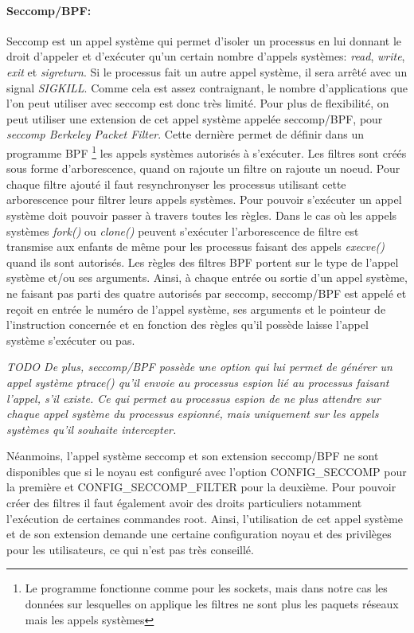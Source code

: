 \paragraph{Seccomp/BPF:}
Seccomp \cite{INTERCEPTION:seccomp_bpf} est un appel système qui permet d'isoler
un processus en lui donnant le droit d'appeler et d'exécuter qu'un certain
nombre d'appels systèmes: \textit{read}, \textit{write}, \textit{exit} et
\textit{sigreturn}. Si le processus fait un autre appel système, il sera arrêté avec un signal \textit{SIGKILL}. Comme cela est assez
contraignant, le nombre d'applications que l'on peut utiliser avec seccomp est
donc très limité. Pour plus de flexibilité, on peut utiliser une extension de
cet appel système appelée seccomp/BPF, pour \textit{seccomp Berkeley Packet
  Filter}. Cette dernière permet de définir dans un programme BPF \footnote{Le
  programme fonctionne comme pour les sockets, mais dans notre cas les données
  sur lesquelles on applique les filtres ne sont plus les paquets réseaux mais
  les appels systèmes} \cite{INTERCEPTION:bpf} les appels systèmes autorisés à
s'exécuter. Les filtres sont créés sous forme d'arborescence, quand on rajoute
un filtre on rajoute un noeud. Pour chaque filtre ajouté il faut resynchronyser
les processus utilisant cette arborescence pour filtrer leurs appels
systèmes. Pour pouvoir s'exécuter un appel système doit pouvoir passer à travers
toutes les règles. Dans le cas où les appels systèmes \textit{fork()} ou
\textit{clone()} peuvent s'exécuter l'arborescence de filtre est transmise aux
enfants de même pour les processus faisant des appels \textit{execve()} quand
ils sont autorisés. Les règles des filtres BPF portent sur le type de l'appel
système et/ou ses arguments. Ainsi, à chaque entrée ou sortie d'un appel
système, ne faisant pas parti des quatre autorisés par seccomp, seccomp/BPF est
appelé et reçoit en entrée le numéro de l'appel système, ses arguments et le
pointeur de l'instruction concernée et en fonction des règles qu'il possède
laisse l'appel système s'exécuter ou pas.

\textit{{\color{red}TODO} De plus, seccomp/BPF possède une option qui lui permet de générer un appel
système ptrace() qu'il envoie au processus espion lié au processus faisant
l'appel, s'il existe. Ce qui permet au processus espion de ne plus attendre sur
chaque appel système du processus espionné, mais uniquement sur les appels
systèmes qu'il souhaite intercepter.}

Néanmoins, l'appel système seccomp et son extension seccomp/BPF ne sont
disponibles que si le noyau est configuré avec l'option CONFIG\_SECCOMP pour la
première et CONFIG\_SECCOMP\_FILTER pour la deuxième. Pour pouvoir créer des
filtres il faut également avoir des droits particuliers notamment l'exécution de
certaines commandes root. Ainsi, l'utilisation de cet appel système et de son
extension demande une certaine configuration noyau et des privilèges pour les
utilisateurs, ce qui n'est pas très conseillé.

